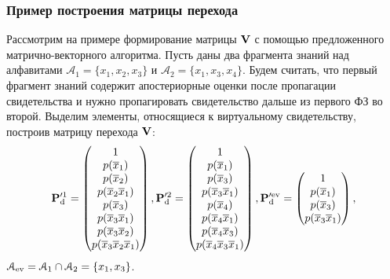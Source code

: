 \subsubsection{Пример построения матрицы перехода}
 Рассмотрим на примере формирование матрицы $\mathbf{V}$ с помощью предложенного матрично-векторного алгоритма. Пусть даны два фрагмента знаний над алфавитами $\mathcal{A}_1 = \{x_1, x_2, x_3\}$ и $\mathcal{A}_2 = \{x_1, x_3, x_4\}$. Будем считать, что первый фрагмент знаний содержит апостериорные оценки после пропагации свидетельства и нужно пропагировать свидетельство дальше из первого ФЗ во второй. 
Выделим элементы, относящиеся к виртуальному свидетельству, построив матрицу перехода $\mathbf{V}$:
\begin{equation*}
\mathbf{P}_\mathrm{d}^{\prime 1} =  \begin{pmatrix}
1 \\ p(\overline{x}_1) \\ p(\overline{x}_2) \\ p(\overline{x}_2\overline{x}_1) \\ p(\overline{x}_3) \\ p(\overline{x}_3\overline{x}_1) \\ p(\overline{x}_3\overline{x}_2) \\ p(\overline{x}_3\overline{x}_2\overline{x}_1)
\end{pmatrix}, 
\mathbf{P}_\mathrm{d}^{\prime 2} =  \begin{pmatrix}
1 \\ p(\overline{x}_1) \\ p(\overline{x}_3) \\ p(\overline{x}_3\overline{x}_1) \\ p(\overline{x}_4) \\ p(\overline{x}_4\overline{x}_1) \\ p(\overline{x}_4\overline{x}_3) \\ p(\overline{x}_4\overline{x}_3\overline{x}_1)
\end{pmatrix},
\mathbf{P}_\mathrm{d}^{\prime \mathrm{ev}} =  \begin{pmatrix}
1 \\ p(\overline{x}_1) \\ p(\overline{x}_3) \\ p(\overline{x}_3\overline{x}_1)
\end{pmatrix},
\end{equation*}
$\mathcal{A}_{\mathrm{ev}} = \mathcal{A}_1 \cap \mathcal{A}_2 = \{x_1, x_3\}$.
 
